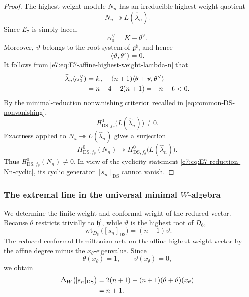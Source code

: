 \documentclass[11pt,reqno]{amsart}
\theoremstyle{definition}
\theoremstyle{remark}
\begin{document}
\begin{proof}
The highest-weight module \(N_n\) has an irreducible highest-weight quotient
\[
  N_n\twoheadrightarrow L(\widehat\lambda_n).
\]
Since \(E_7\) is simply laced,
\[
  \alpha_0^\vee=K-\theta^\vee.
\]
Moreover, \(\vartheta\) belongs to the root system of
\(\mathfrak g^\natural\), and hence
\[
  \langle\vartheta,\theta^\vee\rangle=0.
\]
It follows from \eqref{e7:eq:E7-affine-highest-weight-lambda-n} that
\begin{align*}
  \widehat\lambda_n(\alpha_0^\vee)
  &=k_n-(n+1)
    \langle\theta+\vartheta,\theta^\vee\rangle
    \notag\\
  &=n-4-2(n+1)
    =-n-6<0.
\end{align*}
By the minimal-reduction nonvanishing criterion recalled in
\eqref{eq:common-DS-nonvanishing},
\begin{equation*}
  H^0_{\mathrm{DS},f_\theta}
  \bigl(L(\widehat\lambda_n)\bigr)\ne0.
\end{equation*}
Exactness applied to
\(N_n\twoheadrightarrow L(\widehat\lambda_n)\) gives a surjection
\[
  H^0_{\mathrm{DS},f_\theta}(N_n)
  \twoheadrightarrow
  H^0_{\mathrm{DS},f_\theta}
  \bigl(L(\widehat\lambda_n)\bigr).
\]
Thus \(H^0_{\mathrm{DS},f_\theta}(N_n)\ne0\).  In view of the cyclicity
statement \eqref{e7:eq:E7-reduction-Nn-cyclic}, its cyclic generator
\([s_n]_{\mathrm{DS}}\) cannot vanish.
\end{proof}

\subsubsection{The extremal line in the universal minimal
\texorpdfstring{\(W\)}{W}-algebra}


We determine the finite weight and conformal weight of the reduced vector.
Because \(\theta\) restricts trivially to \(\mathfrak h^\natural\), while
\(\vartheta\) is the highest root of \(D_6\),
\begin{equation}
  \operatorname{wt}_{D_6}
  \bigl([s_n]_{\mathrm{DS}}\bigr)
  =(n+1)\vartheta.
  \label{e7:eq:E7-reduced-singular-vector-D6-weight}
\end{equation}
The reduced conformal Hamiltonian acts on the affine highest-weight vector
by the affine degree minus the \(x_\theta\)-eigenvalue.  Since
\[
  \theta(x_\theta)=1,
  \qquad
  \vartheta(x_\theta)=0,
\]
we obtain
\begin{align}
  \Delta_W\bigl([s_n]_{\mathrm{DS}}\bigr)
  &=2(n+1)
    -(n+1)(\theta+\vartheta)(x_\theta)
    \notag\\
  &=n+1.
  \label{e7:eq:E7-reduced-singular-vector-conformal-weight}
\end{align}
\end{document}
